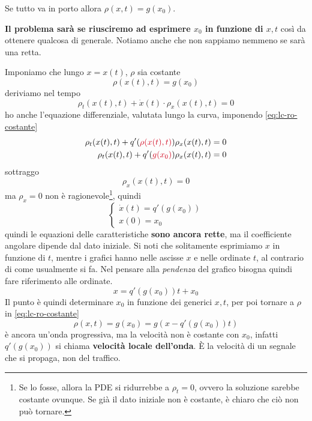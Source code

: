 \documentclass[10pt,a4paper,twoside,openright]{book}
\begin{document}

Se tutto va in porto allora $\rho ( x,t) =g( x_{0})$.

\textbf{Il problema sarà se riusciremo ad esprimere $x_{0}$ in funzione di $x,t$} così da ottenere qualcosa di generale. Notiamo anche che non sappiamo nemmeno se sarà una retta.

Imponiamo che lungo $x=x( t)$, $\rho $ sia costante
\begin{equation}
	\rho ( x( t) ,t) =g( x_{0})
	\label{eq:lc-ro-costante}
\end{equation}
deriviamo nel tempo
\begin{equation*}
	\rho _{t}( x( t) ,t) +\dot{x}( t) \cdotp \rho _{x}( x( t) ,t) =0
\end{equation*}
ho anche l'equazione differenziale, valutata lungo la curva, imponendo \eqref{eq:lc-ro-costante}
\begin{align*}
	\rho _{t}( x( t) ,t) +q'(\textcolor[rgb]{0.82,0.01,0.11}{\rho ( x( t) ,t)}) \rho _{x}( x( t) ,t) &=0\\
	\rho _{t}( x( t) ,t) +q'(\textcolor[rgb]{0.82,0.01,0.11}{g( x_{0})}) \rho _{x}( x( t) ,t) &=0
\end{align*}
sottraggo
\begin{equation*}
	[\dot{x}( t) -q'( g( x_{0}))] \rho _{x}( x( t) ,t) =0
\end{equation*}
ma $\rho _{x} =0$ non è ragionevole\footnote{Se lo fosse, allora la PDE si ridurrebbe a $\rho _{t}=0$, ovvero la soluzione sarebbe costante ovunque. Se già il dato iniziale non è costante, è chiaro che ciò non può tornare.}, quindi
\begin{equation*}
	\begin{cases}
		\dot{x}( t) =q'( g( x_{0})) \\
		x( 0) =x_{0}                
	\end{cases}
\end{equation*}
quindi le equazioni delle caratteristiche \textbf{sono ancora rette}, ma il coefficiente angolare dipende dal dato iniziale. Si noti che solitamente esprimiamo $x$ in funzione di $t$, mentre i grafici hanno nelle ascisse $x$ e nelle ordinate $t$, al contrario di come usualmente si fa. Nel pensare alla \emph{pendenza} del grafico bisogna quindi fare riferimento alle ordinate.
\begin{equation}
	x=q'( g( x_{0})) t+x_{0}
\end{equation}
Il punto è quindi determinare $x_{0}$ in funzione dei generici $x,t$, per poi tornare a $\rho $ in \eqref{eq:lc-ro-costante}
\begin{equation}
	\rho ( x,t) =g( x_{0}) =g( x-q'( g( x_{0})) t)
	\label{eq:lc-sol-ro-traffico}
\end{equation}
è ancora un'onda progressiva, ma la velocità non è costante con $x_{0}$, infatti $q'( g( x_{0}))$ si chiama \textbf{velocità locale dell'onda}. È la velocità di un segnale che si propaga, non del traffico.
\end{document}
